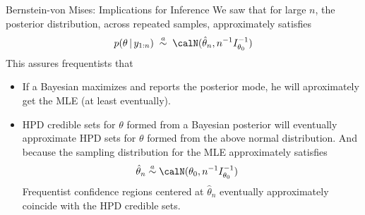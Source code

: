 \documentclass[aspectratio=169, handout]{beamer}
\begin{document}
{\footnotesize
\begin{frame}{Bernstein-von Mises: Implications for Inference}
We saw that for large $n$, the posterior distribution, across repeated
samples, approximately satisfies
\begin{align*}
  p(\theta \,|\,y_{1:n})
  \;\overset{a}{\sim}\;
  \calN(\hat{\theta}_n,n^{-1}I_{\theta_0}^{-1})
\end{align*}
This assures frequentists that
\begin{itemize}
  \item If a Bayesian maximizes and reports the \alert{posterior mode},
    he will aproximately get the \alert{MLE} (at least eventually).

  \item HPD credible sets for $\theta$ formed from a Bayesian posterior
    will eventually approximate HPD sets for $\theta$ formed from the
    above normal distribution.
    And because the sampling distribution for the MLE approximately
    satisfies
    \begin{align*}
      \hat{\theta}_n
      &\overset{a}{\sim}
      \calN(\theta_0,n^{-1}I_{\theta_0}^{-1})
    \end{align*}
    Frequentist \alert{confidence regions} centered at $\hat{\theta}_n$
    eventually approximately \alert{coincide} with the
    \alert{HPD credible sets}.
\end{itemize}
\end{frame}
}
\end{document}
